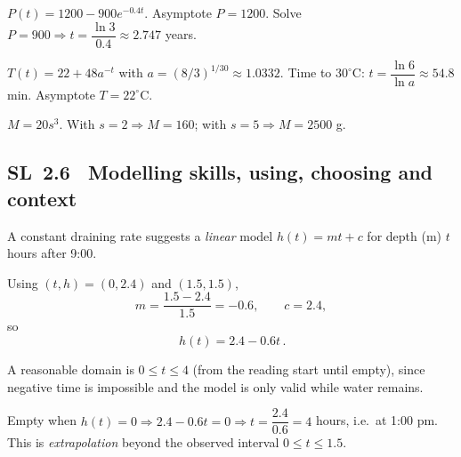 \documentclass[11pt]{article}
\def\textbf#1{#1}%
\newcommand{\tocsubsection}[1]{\subsection{#1}}
\begin{document}
\begin{solution}
$P(t)=1200-900e^{-0.4t}$. Asymptote $P=1200$. Solve $P=900\Rightarrow t=\dfrac{\ln 3}{0.4}\approx2.747$ years.\\
\end{solution}

\begin{solution}
$T(t)=22+48a^{-t}$ with $a=(8/3)^{1/30}\approx1.0332$. Time to $30^\circ$C: $t=\dfrac{\ln 6}{\ln a}\approx54.8$ min. Asymptote $T=22^\circ$C.\\
\end{solution}

\begin{solution}
$M=20s^3$. With $s=2\Rightarrow M=160$; with $s=5\Rightarrow M=2500$ g.\\
\end{solution}




\tocsubsection{SL 2.6 \; Modelling skills, using, choosing and context}

\begin{solution}
A constant draining rate suggests a \emph{linear} model $h(t)=mt+c$ for depth (m) $t$ hours after 9:00.

Using $(t,h)=(0,2.4)$ and $(1.5,1.5)$,
\[
m=\frac{1.5-2.4}{1.5}=-0.6,\qquad c=2.4,
\]
so
\[
\boxed{\,h(t)=2.4-0.6t\,}.
\]

A reasonable domain is $0\le t\le 4$ (from the reading start until empty), since negative time is impossible and the model is only valid while water remains.

Empty when $h(t)=0\Rightarrow 2.4-0.6t=0\Rightarrow t=\dfrac{2.4}{0.6}=4$ hours,
i.e.\ at \textbf{1:00 pm}. This is \emph{extrapolation} beyond the observed interval $0\le t\le 1.5$.
\end{solution}
\end{document}
